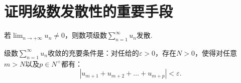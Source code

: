 \section{证明级数发散性的重要手段}

\begin{theorem}
	若$\displaystyle\lim_{n\to+\infty}u_n \neq 0$，则数项级数$\displaystyle\sum_{n=1}^{\infty}u_n$发散.
\end{theorem}

\begin{theorem}[级数的Cauchy收敛准则]
	级数$\displaystyle\sum_{n=1}^{\infty}u_n$收敛的充要条件是：对任给的$\varepsilon>0$，存在$N>0$，使得对任意$m>N$以及$p\in N^+$都有：
	\begin{equation}
		|u_{m+1}+u_{m+2}+\dots+u_{m+p}|<\varepsilon.
	\end{equation}
\end{theorem}